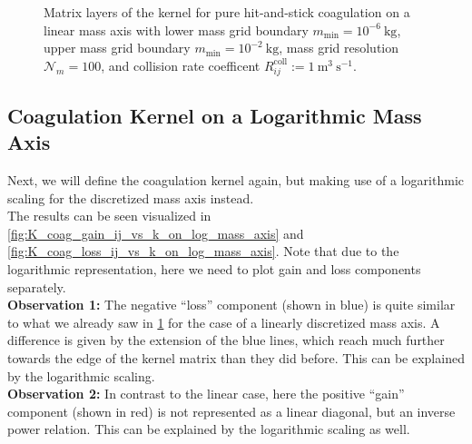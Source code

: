    \clearpage

        \begin{figure}[h!]
            \makebox[\textwidth]{
                \texttt{[image: 101/Kkij vs k, coag=True, frag=False.pdf]}
            }
            \caption{ 
                Matrix layers of the kernel for pure hit-and-stick coagulation on a linear mass 
                axis with 
                lower mass grid boundary $m_\text{min}=10^{-6}\ \text{kg}$, 
                upper mass grid boundary $m_\text{min}=10^{-2}\ \text{kg}$, 
                mass grid resolution $\mathcal N_m=100$, and 
                collision rate coefficent $R_{ij}^\text{coll} := 1\ \text{m}^3\ \text{s}^{-1}$.
            }
            \label{fig:K_coag_ij_vs_k_on_linear_mass_axis}
        \end{figure}

    \subsection{Coagulation Kernel on a Logarithmic Mass Axis}

        Next, we will define the coagulation kernel again, but making use of a logarithmic 
        scaling for the discretized mass axis instead. \\

        The results can be seen visualized in \cref{fig:K_coag_gain_ij_vs_k_on_log_mass_axis} 
        and \cref{fig:K_coag_loss_ij_vs_k_on_log_mass_axis}. Note that due to the logarithmic
        representation, here we need to plot gain and loss components separately. \\

        \textbf{Observation 1:} The negative ``loss'' component (shown in blue) is quite similar to 
        what we already saw in \cref{fig:K_coag_ij_vs_k_on_linear_mass_axis} for the case of a 
        linearly discretized mass axis. A difference is given by the extension of the blue lines, 
        which reach much further towards the edge of the kernel matrix than they did before.
        This can be explained by the logarithmic scaling. \\

        \textbf{Observation 2:} In contrast to the linear case, here the positive ``gain''
        component (shown in red) is not represented as a linear diagonal, but an 
        inverse power relation. This can be explained by the logarithmic scaling as well. 

